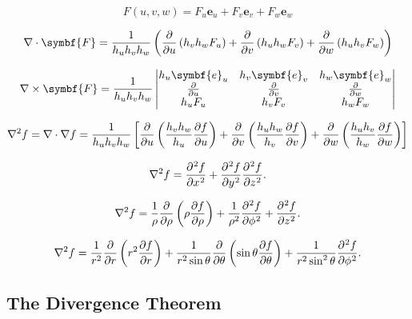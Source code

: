 \begin{equation*}
	F\left(u,v,w\right)=
	F_{u}\symbf{e}_{u}+
	F_{v}\symbf{e}_{v}+
	F_{w}\symbf{e}_{w}
\end{equation*}

\begin{equation*}
	\nabla\cdot\symbf{F}=
	\frac{1}{h_{u}h_{v}h_{w}}
	\left(
	\diffp{}{u}\left(h_{v}h_{w}F_{u}\right)+
	\diffp{}{v}\left(h_{u}h_{w}F_{v}\right)+
	\diffp{}{w}\left(h_{u}h_{v}F_{w}\right)
	\right)
\end{equation*}

\begin{equation*}
	\nabla\times\symbf{F}=
	\frac{1}{h_{u}h_{v}h_{w}}
	\begin{vmatrix}
		h_{u}\symbf{e}_{u} & h_{v}\symbf{e}_{v} & h_{w}\symbf{e}_{w} \\
		\diffp{}{u}        & \diffp{}{v}        & \diffp{}{w}        \\
		h_{u}F_{u}         & h_{v}F_{v}         & h_{w}F_{w}
	\end{vmatrix}
\end{equation*}

\begin{equation*}
	\nabla^{2}f=
	\nabla\cdot\nabla f=
	\frac{1}{h_{u}h_{v}h_{w}}
	\left[
		\diffp{}{u}\left(\frac{h_{v}h_{w}}{h_{u}}\diffp{f}{u}\right)+
		\diffp{}{v}\left(\frac{h_{u}h_{w}}{h_{v}}\diffp{f}{v}\right)+
		\diffp{}{w}\left(\frac{h_{u}h_{v}}{h_{w}}\diffp{f}{w}\right)
		\right]
\end{equation*}

\begin{equation*}
	\nabla^{2}f=
	\diffp[2]{f}{x}+
	\diffp[2]{f}{y}
	\diffp[2]{f}{z}.
\end{equation*}

\begin{equation*}
	\nabla^{2}f=
	\frac{1}{\rho}
	\diffp{}{\rho}
	\left(\rho\diffp{f}{\rho}\right)+
	\frac{1}{\rho^{2}}\diffp[2]{f}{\phi}+
	\diffp[2]{f}{z}.
\end{equation*}

\begin{equation*}
	\nabla^{2}f=
	\frac{1}{r^{2}}
	\diffp{}{r}\left(r^{2}\diffp{f}{r}\right)+
	\frac{1}{r^{2}\sin\theta}
	\diffp{}{\theta}
	\left(\sin\theta\diffp{f}{\theta}\right)+
	\frac{1}{r^{2}\sin^{2}\theta}
	\diffp[2]{f}{\phi}.
\end{equation*}

\subsection{The Divergence Theorem}

